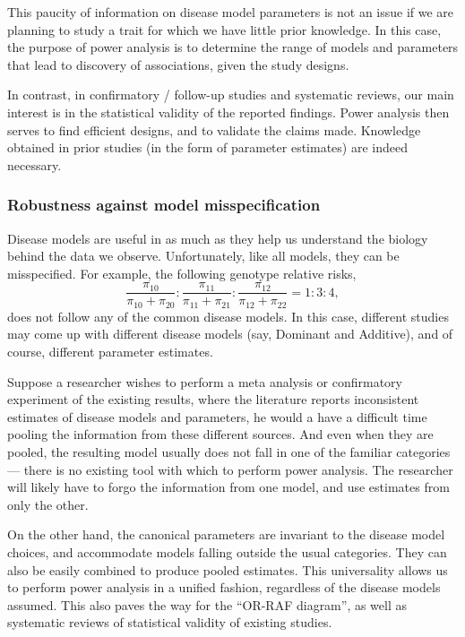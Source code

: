 This paucity of information on disease model parameters is not an issue if we are planning to study a trait for which we have little prior knowledge.
In this case, the purpose of power analysis is to determine the range of models and parameters that lead to discovery of associations, given the study designs.

In contrast, in confirmatory / follow-up studies and systematic reviews, our main interest is in the statistical validity of the reported findings.
Power analysis then serves to find efficient designs, and to validate the claims made.
Knowledge obtained in prior studies (in the form of parameter estimates) are indeed necessary.

\subsubsection{Robustness against model misspecification}

Disease models are useful in as much as they help us understand the biology behind the data we observe.
Unfortunately, like all models, they can be misspecified. 
For example, the following genotype relative risks,
\begin{equation*}
    \frac{\pi_{10}}{\pi_{10} + \pi_{20}} : \frac{\pi_{11}}{\pi_{11} + \pi_{21}} : \frac{\pi_{12}}{\pi_{12} + \pi_{22}}
    = 1 : 3 : 4,
\end{equation*}
does not follow any of the common disease models.
In this case, different studies may come up with different disease models (say, Dominant and Additive), and of course, different parameter estimates.

Suppose a researcher wishes to perform a meta analysis or confirmatory experiment of the existing results, where the literature reports inconsistent estimates of disease models and parameters,
he would a have a difficult time pooling the information from these different sources. 
And even when they are pooled, the resulting model usually does not fall in one of the familiar categories --- there is no existing tool with which to perform power analysis.
The researcher will likely have to forgo the information from one model, and use estimates from only the other.

On the other hand, the canonical parameters are invariant to the disease model choices, and accommodate models falling outside the usual categories. 
They can also be easily combined to produce pooled estimates.
This universality allows us to perform power analysis in a unified fashion, regardless of the disease models assumed.
This also paves the way for the ``OR-RAF diagram'', as well as systematic reviews of statistical validity of existing studies.

